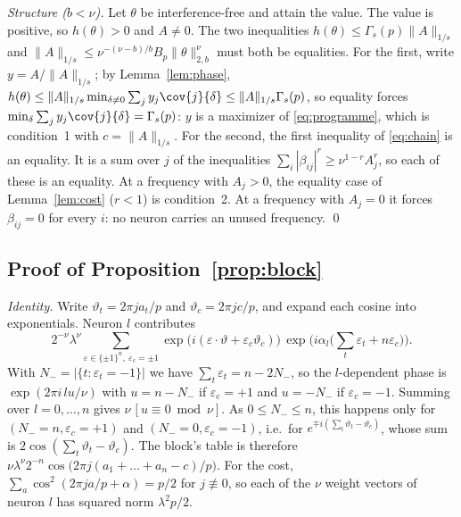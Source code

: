 \emph{Structure ($b<\nu$).} Let $\theta$ be interference-free and attain the value. The value is positive, so $h(\theta)>0$ and $A\neq0$. The two inequalities $h(\theta)\le\Gamma_s(p)\|A\|_{1/s}$ and $\|A\|_{1/s}\le\nu^{-(\nu-b)/b}B_p\|\theta\|_{2,b}^\nu$ must both be equalities. For the first, write $y=A/\|A\|_{1/s}$; by Lemma~\ref{lem:phase}, $h(\theta)\le\|A\|_{1/s}\min_{\delta\neq0}\sum_jy_j\cov{j}{\delta}\le\|A\|_{1/s}\Gamma_s(p)$, so equality forces $\min_\delta\sum_jy_j\cov{j}{\delta}=\Gamma_s(p)$: $y$ is a maximizer of \eqref{eq:programme}, which is condition~1 with $c=\|A\|_{1/s}$. For the second, the first inequality of \eqref{eq:chain} is an equality. It is a sum over $j$ of the inequalities $\sum_i|\beta_{ij}|^r\ge\nu^{1-r}A_j^r$, so each of these is an equality. At a frequency with $A_j>0$, the equality case of Lemma~\ref{lem:cost} ($r<1$) is condition~2. At a frequency with $A_j=0$ it forces $\beta_{ij}=0$ for every $i$: no neuron carries an unused frequency.
\qed

\subsection{Proof of Proposition~\ref{prop:block}}\label{app:block}

\emph{Identity.} Write $\vartheta_t=2\pi ja_t/p$ and $\vartheta_c=2\pi jc/p$, and expand each cosine into exponentials. Neuron $l$ contributes
\[
2^{-\nu}\lambda^\nu\sum_{\varepsilon\in\{\pm1\}^n,\ \varepsilon_c=\pm1}\exp\!\big(i(\varepsilon\cdot\vartheta+\varepsilon_c\vartheta_c)\big)\,\exp\!\Big(i\alpha_l\big(\textstyle\sum_t\varepsilon_t+n\varepsilon_c\big)\Big).
\]
With $N_-=|\{t:\varepsilon_t=-1\}|$ we have $\sum_t\varepsilon_t=n-2N_-$, so the $l$-dependent phase is $\exp(2\pi i\,lu/\nu)$ with $u=n-N_-$ if $\varepsilon_c=+1$ and $u=-N_-$ if $\varepsilon_c=-1$. Summing over $l=0,\dots,n$ gives $\nu\,[u\equiv0\bmod\nu]$. As $0\le N_-\le n$, this happens only for $(N_-=n,\varepsilon_c=+1)$ and $(N_-=0,\varepsilon_c=-1)$, i.e.\ for $e^{\mp i(\sum_t\vartheta_t-\vartheta_c)}$, whose sum is $2\cos(\sum_t\vartheta_t-\vartheta_c)$. The block's table is therefore $\nu\lambda^\nu2^{-n}\cos\big(2\pi j(a_1+\dots+a_n-c)/p\big)$. For the cost, $\sum_a\cos^2(2\pi ja/p+\alpha)=p/2$ for $j\not\equiv0$, so each of the $\nu$ weight vectors of neuron $l$ has squared norm $\lambda^2p/2$.

